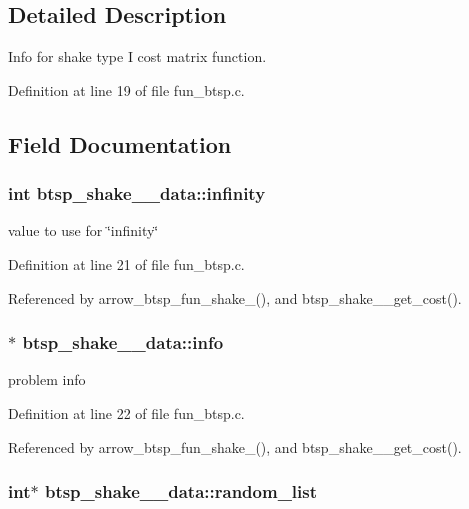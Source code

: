 \subsection{Detailed Description}
Info for shake type I cost matrix function. 

Definition at line 19 of file fun\_\-btsp.c.

\subsection{Field Documentation}
\hypertarget{structbtsp__shake__1__data_61ef59ce5b0bb86d9b50b52a039de9db}{
\subsubsection[{infinity}]{\setlength{\rightskip}{0pt plus 5cm}int {\bf btsp\_\-shake\_\_\-data::infinity}}}
\label{structbtsp__shake__1__data_61ef59ce5b0bb86d9b50b52a039de9db}


value to use for \char`\"{}infinity\char`\"{} 

Definition at line 21 of file fun\_\-btsp.c.

Referenced by arrow\_\-btsp\_\-fun\_\-shake\_(), and btsp\_\-shake\_\_\-get\_\-cost().\hypertarget{structbtsp__shake__1__data_7d94d439381cbceadaa37f5da8504532}{
\subsubsection[{info}]{$\ast$ {\bf btsp\_\-shake\_\_\-data::info}}}
\label{structbtsp__shake__1__data_7d94d439381cbceadaa37f5da8504532}


problem info 

Definition at line 22 of file fun\_\-btsp.c.

Referenced by arrow\_\-btsp\_\-fun\_\-shake\_(), and btsp\_\-shake\_\_\-get\_\-cost().\hypertarget{structbtsp__shake__1__data_6f426a2ed61679a7b36b8dad28565c07}{
\subsubsection[{random\_\-list}]{\setlength{\rightskip}{0pt plus 5cm}int$\ast$ {\bf btsp\_\-shake\_\_\-data::random\_\-list}}}
\label{structbtsp__shake__1__data_6f426a2ed61679a7b36b8dad28565c07}


